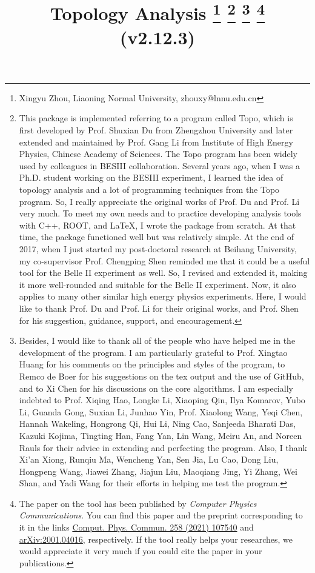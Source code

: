 \documentclass[landscape]{article}
\begin{document}
\title{Topology Analysis \footnote{\small{Xingyu Zhou, Liaoning Normal University, zhouxy@lnnu.edu.cn}} \footnote{\small{This package is implemented referring to a program called {\sc Topo}, which is first developed by Prof. Shuxian Du from Zhengzhou University and later extended and maintained by Prof. Gang Li from Institute of High Energy Physics, Chinese Academy of Sciences. The {\sc Topo} program has been widely used by colleagues in BESIII collaboration. Several years ago, when I was a Ph.D. student working on the BESIII experiment, I learned the idea of topology analysis and a lot of programming techniques from the {\sc Topo} program. So, I really appreciate the original works of Prof. Du and Prof. Li very much. To meet my own needs and to practice developing analysis tools with C++, ROOT, and LaTeX, I wrote the package from scratch. At that time, the package functioned well but was relatively simple. At the end of 2017, when I just started my post-doctoral research at Beihang University, my co-supervisor Prof. Chengping Shen reminded me that it could be a useful tool for the Belle II experiment as well. So, I revised and extended it, making it more well-rounded and suitable for the Belle II experiment. Now, it also applies to many other similar high energy physics experiments. Here, I would like to thank Prof. Du and Prof. Li for their original works, and Prof. Shen for his suggestion, guidance, support, and encouragement.}} \footnote{\small{Besides, I would like to thank all of the people who have helped me in the development of the program. I am particularly grateful to Prof. Xingtao Huang for his comments on the principles and styles of the program, to Remco de Boer for his suggestions on the tex output and the use of GitHub, and to Xi Chen for his discussions on the core algorithms. I am especially indebted to Prof. Xiqing Hao, Longke Li, Xiaoping Qin, Ilya Komarov, Yubo Li, Guanda Gong, Suxian Li, Junhao Yin, Prof. Xiaolong Wang, Yeqi Chen, Hannah Wakeling, Hongrong Qi, Hui Li, Ning Cao, Sanjeeda Bharati Das, Kazuki Kojima, Tingting Han, Fang Yan, Lin Wang, Meiru An, and Noreen Rauls for their advice in extending and perfecting the program. Also, I thank Xi'an Xiong, Runqiu Ma, Wencheng Yan, Sen Jia, Lu Cao, Dong Liu, Hongpeng Wang, Jiawei Zhang, Jiajun Liu, Maoqiang Jing, Yi Zhang, Wei Shan, and Yadi Wang for their efforts in helping me test the program.}} \footnote{\small{The paper on the tool has been published by {\it Computer Physics Communications}. You can find this paper and the preprint corresponding to it in the links \href{https://doi.org/10.1016/j.cpc.2020.107540}{Comput. Phys. Commun. 258 (2021) 107540} and \href{https://arxiv.org/abs/2001.04016}{arXiv:2001.04016}, respectively. If the tool really helps your researches, we would appreciate it very much if you could cite the paper in your publications.}} \\ \vspace{1cm} \Large{(v2.12.3)}}
\maketitle
\end{document}
